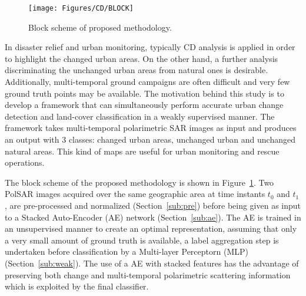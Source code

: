 \begin{figure}[tbhp]
\centering
\texttt{[image: Figures/CD/BLOCK]}
\caption{Block scheme of proposed methodology.}
\label{fig:1_method}
\end{figure}

\label{sec:Method}
In disaster relief and urban monitoring, typically CD analysis is applied in order to highlight the changed urban areas. On the other hand, a further analysis discriminating the unchanged urban areas from natural ones is desirable. Additionally, multi-temporal ground campaigns are often difficult and very few ground truth points may be available.   
The motivation behind this study is to develop a framework that can simultaneously perform accurate urban change detection and land-cover classification in a weakly supervised manner. The framework takes multi-temporal polarimetric SAR images as input and produces an output with 3 classes: changed urban areas, unchanged urban and unchanged natural areas. This kind of maps are useful for urban monitoring and rescue operations. %

The  block scheme of the proposed methodology is shown in Figure~\ref{fig:1_method}. Two PolSAR images  acquired over the same geographic area at time instants $t_0$ and $t_1$,  are pre-processed and normalized  (Section~\ref{sub:pre})  before being given as input to a Stacked Auto-Encoder (AE) network (Section~\ref{sub:ae}). The AE is trained in an unsupervised manner to create an optimal representation, assuming that only a very small amount of ground truth is available, a label aggregation step is undertaken before classification by a Multi-layer Perceptorn (MLP) (Section~\ref{sub:weak}). 
The use of a AE with stacked features has the advantage of preserving both change and multi-temporal polarimetric scattering information which is exploited by the final classifier. %


